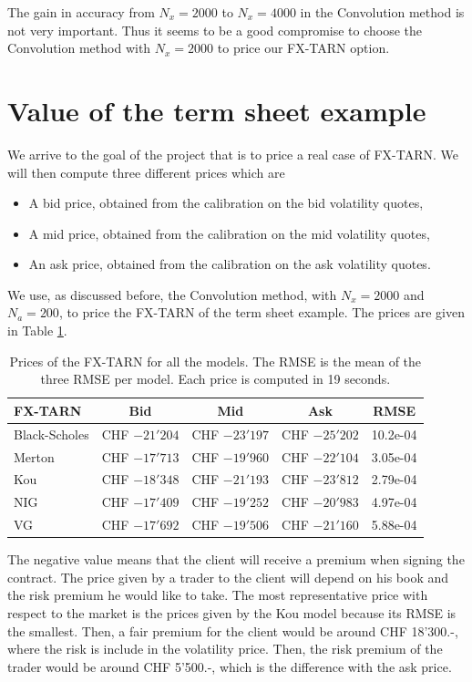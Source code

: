 The gain in accuracy from $N_x = 2000$ to $N_x = 4000$ in the Convolution method is not very important. Thus it seems to be a good compromise to choose the Convolution method with $N_x = 2000$ to price our FX-TARN option.

\section{Value of the term sheet example}
\label{sec:res:TS}
We arrive to the goal of the project that is to price a real case of FX-TARN. We will then compute three different prices which are
\begin{itemize}
\item A bid price, obtained from the calibration on the bid volatility quotes,
\item A mid price, obtained from the calibration on the mid volatility quotes,
\item An ask price, obtained from the calibration on the ask volatility quotes.
\end{itemize}

We use, as discussed before, the Convolution method, with $N_x = 2000$ and $N_a = 200$, to price the FX-TARN of the term sheet example. The prices are given in Table \ref{tab:prices}.

\begin{table}[!ht]
\centering
  \begin{tabular}{l||c|c|c||c}
    \toprule
    \textbf{FX-TARN} & Bid & Mid & Ask & RMSE \\
    \toprule
   Black-Scholes 	& CHF $-21'204$ & CHF $-23'197$ & CHF $-25'202$ & 10.2e-04\\
   Merton 			& CHF $-17'713$ & CHF $-19'960$ & CHF $-22'104$ & 3.05e-04\\
   Kou 				& CHF $-18'348$ & CHF $-21'193$ & CHF $-23'812$ & 2.79e-04\\
   NIG 				& CHF $-17'409$ & CHF $-19'252$ & CHF $-20'983$ & 4.97e-04\\
   VG 				& CHF $-17'692$ & CHF $-19'506$ & CHF $-21'160$ & 5.88e-04\\
    \bottomrule
  \end{tabular}
  \vspace{5pt}
  \caption{\label{tab:prices} Prices of the FX-TARN for all the models. The RMSE is the mean of the three RMSE per model. Each price is computed in 19 seconds.}
\end{table}

The negative value means that the client will receive a premium when signing the contract. The price given by a trader to the client will depend on his book and the risk premium he would like to take. The most representative price with respect to the market is the prices given by the Kou model because its RMSE is the smallest. Then, a fair premium for the client would be around CHF 18'300.-, where the risk is include in the volatility price. Then, the risk premium of the trader would be around CHF 5'500.-, which is the difference with the ask price.

